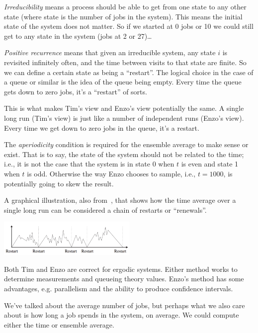 \documentclass[a4paper]{report}
\begin{document}
\textit{Irreducibility} means a process should be able to get from one state to any other state (where state is the number of jobs in the system). This means the initial state of the system does not matter. So if we started at 0 jobs or 10 we could still get to any state in the system (jobs at 2 or 27)\ldots

\textit{Positive recurrence} means that given an irreducible system, any state $i$ is revisited infinitely often, and the time between visits to that state are finite. So we can define a certain state as being a ``restart''. The logical choice in the case of a queue or similar is the idea of the queue being empty. Every time the queue gets down to zero jobs, it's a ``restart'' of sorts. 

This is what makes Tim's view and Enzo's view potentially the same. A single long run (Tim's view) is just like a number of independent runs (Enzo's view). Every time we get down to zero jobs in the queue, it's a restart. 

The \textit{aperiodicity} condition is required for the ensemble average to make sense or exist. That is to say, the state of the system should not be related to the time; i.e., it is not the case that the system is in state 0 when $t$ is even and state 1 when $t$ is odd. Otherwise the way Enzo chooses to sample, i.e., $t = 1000$, is potentially going to skew the result.

A graphical illustration, also from~\cite{pmd}, that shows how the time average over a single long run can be considered a chain of restarts or ``renewals''.

\begin{center}
	\includegraphics[width=0.5\textwidth]{images/systemrestart.png}
\end{center}

Both Tim and Enzo are correct for ergodic systems. Either method works to determine measurements and queueing theory values. Enzo's method has some advantages, e.g. parallelism and the ability to produce confidence intervals.

We've talked about the average number of jobs, but perhaps what we also care about is how long a job spends in the system, on average. We could compute either the time or ensemble average. 
\end{document}
